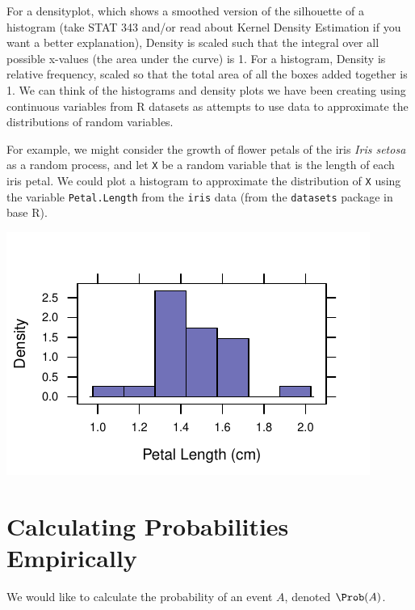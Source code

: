 \documentclass[twoside]{book}\usepackage[]{graphicx}\usepackage[]{xcolor}
\makeatletter
\def\maxwidth{ %
  \ifdim\Gin@nat@width>\linewidth
    \linewidth
  \else
    \Gin@nat@width
  \fi
}
\newenvironment{knitrout}{}{} %
\newcommand{\Rindex}[1]{\index{\texttt{#1}}}
\newcommand{\dataframe}[1]{{\color{blue!80!black}\texttt{#1}}\Rindex{#1}}
\newcommand{\pkg}[1]{{\color{red!80!black}\texttt{#1}}\Rindex{#1}}
\newcounter{example}[section]
\makeatother
\begin{document}
For a densityplot, which shows a smoothed version of the silhouette of a histogram (take STAT 343 and/or read about Kernel Density Estimation if you want a better explanation), Density is scaled such that the integral over all possible x-values (the area under the curve) is 1. For a histogram, Density is relative frequency, scaled so that the total area of all the boxes added together is 1.  We can think of the histograms and density plots we have been creating using continuous variables from R datasets as attempts to use data to approximate the distributions of random variables.  

For example, we might consider the growth of flower petals of the iris \textit{Iris setosa} as a random process, and let \texttt{X} be a random variable that is the length of each iris petal.  We could plot a histogram to approximate the distribution of \texttt{X} using the variable \texttt{Petal.Length} from the \dataframe{iris} data (from the \pkg{datasets} package in base R).

\begin{knitrout}
\color{fgcolor}

{\centering \includegraphics[width=\maxwidth]{figures/fig-cont_pdf-1} 

}



\end{knitrout}

\newpage

\section{Calculating Probabilities Empirically}

We would like to calculate the probability of an event
$A$, denoted $\Prob(A)$.
\end{document}
